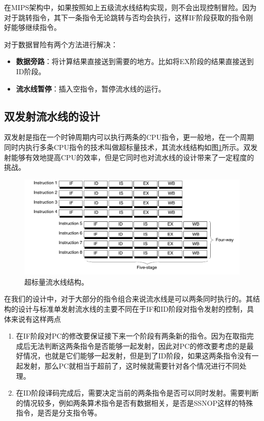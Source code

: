 在MIPS架构中，如果按照如上五级流水线结构实现，则不会出现控制冒险。因为对于跳转指令，其下一条指令无论跳转与否均会执行，这样IF阶段获取的指令刚好能够继续指令。

对于数据冒险有两个方法进行解决：

\begin{itemize}
	\item \textbf{数据旁路}：将计算结果直接送到需要的地方。比如将EX阶段的结果直接送到ID阶段。
	\item \textbf{流水线暂停}：插入空指令，暂停流水线的运行。
\end{itemize}

\subsection{双发射流水线的设计}
双发射是指在一个时钟周期内可以执行两条的CPU指令，更一般地，在一个周期同时内执行多条CPU指令的技术叫做超标量技术，其流水线结构如图\ref{fig:superscalar}所示。双发射能够有效地提高CPU的效率，但是它同时也对流水线的设计带来了一定程度的挑战。

\begin{figure}[htbp]
	\centering
	\includegraphics[width=\linewidth]{superscalar.png}
	\caption{超标量流水线结构。}
	\label{fig:superscalar}
\end{figure}

在我们的设计中，对于大部分的指令组合来说流水线是可以两条同时执行的。其结构的设计与标准单发射流水线的主要不同在于IF和ID阶段对指令发射的控制，具体来说有这样两点
\begin{enumerate}
	\item 在IF阶段对PC的修改要保证接下来一个阶段有两条新的指令。因为在取指完成后无法判断这两条指令是否能够一起发射，因此对PC的修改要考虑的是最好情况，也就是它们能够一起发射，但是到了ID阶段，如果这两条指令没有一起发射，那么PC就相当于超前了，这时候就需要针对各个情况进行不同处理。
	\item 在ID阶段译码完成后，需要决定当前的两条指令是否可以同时发射。需要判断的情况较多，例如两条算术指令是否有数据相关，是否是SSNOP这样的特殊指令，是否是分支指令等。
\end{enumerate}

